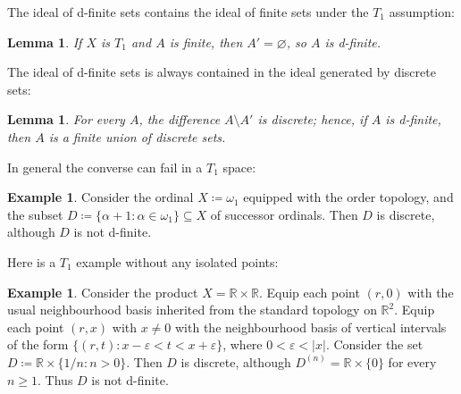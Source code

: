 \documentclass[11pt]{amsart}
\theoremstyle{plain}
\newtheorem{lemma}[thm]{Lemma}
\theoremstyle{definition}
\newtheorem{example}[thm]{Example}
\numberwithin{equation}{section}
\newcommand\R{\mathbb{R}}
\newcommand\0{\varnothing}
\begin{document}
\noindent
The ideal of d-finite sets contains the ideal of finite sets under the $T_1$ assumption:
\begin{lemma}\label{finite_is_dfinite_T1}
If $X$ is $T_1$ and $A$ is finite, then $A'=\varnothing$, so $A$ is d-finite.
\end{lemma}

\noindent
The ideal of d-finite sets is always contained in the ideal generated by discrete sets:

\begin{lemma}\label{CBsmall_implies_finite_union_discrete}
For every $A$, the difference $A\setminus A'$ is discrete; hence, if $A$ is d-finite, then $A$ is a finite union of discrete sets.
\end{lemma}

\noindent
In general the converse can fail in a $T_1$ space:

\begin{example}\label{counterexample_discrete_not_CB_finite}
Consider the ordinal $X\coloneqq\omega_1$ equipped with the order topology, and the subset $D\coloneqq\{\alpha+1:\alpha\in \omega_1\}\subseteq X$ of successor ordinals. Then $D$ is discrete, although $D$ is not d-finite.
\end{example}

\noindent
Here is a $T_1$ example without any isolated points:

\begin{example}\label{second_counterexample_discrete_not_CB_finite}
Consider the product $X=\R\times\R$. Equip each point $(r,0)$ with the usual neighbourhood basis inherited from the standard topology on $\R^2$. Equip each point $(r,x)$ with $x\neq0$ with the neighbourhood basis of vertical intervals of the form $\{(r,t):x-\varepsilon<t<x+\varepsilon\}$, where $0<\varepsilon<|x|$. Consider the set $D\coloneqq\R\times\{1/n:n>0\}$. Then $D$ is discrete, although $D^{(n)}=\R\times\{0\}$ for every $n\geq 1$. Thus $D$ is not d-finite.
\end{example}
\end{document}
